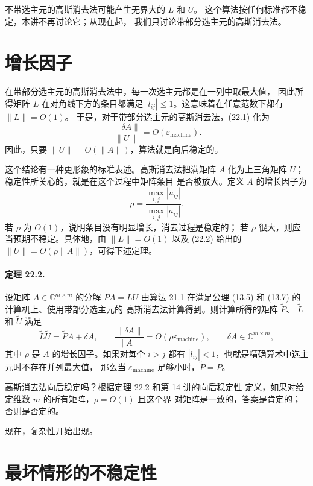\documentclass[UTF8,fontset=none,12pt]{ctexart}
\newcommand{\epsmach}{\varepsilon_{\mathrm{machine}}}
\begin{document}
不带选主元的高斯消去法可能产生无界大的 $L$ 和 $U$。
这个算法按任何标准都不稳定，本讲不再讨论它；从现在起，
我们只讨论带部分选主元的高斯消去法。

\section*{增长因子}

在带部分选主元的高斯消去法中，每一次选主元都是在一列中取最大值，
因此所得矩阵 $L$ 在对角线下方的条目都满足
$|l_{ij}|\le 1$。这意味着在任意范数下都有 $\|L\|=O(1)$。
于是，对于带部分选主元的高斯消去法，(22.1) 化为
\begin{equation*}
 \frac{\|\delta A\|}{\|U\|}=O(\epsmach).
\end{equation*}
因此，只要 $\|U\|=O(\|A\|)$，算法就是向后稳定的。

这个结论有一种更形象的标准表述。高斯消去法把满矩阵 $A$
化为上三角矩阵 $U$；稳定性所关心的，就是在这个过程中矩阵条目
是否被放大。定义 $A$ 的增长因子为
\begin{equation}
 \rho=\frac{\displaystyle\max_{i,j}|u_{ij}|}
 {\displaystyle\max_{i,j}|a_{ij}|}.
 \tag{22.2}
\end{equation}
若 $\rho$ 为 $O(1)$，说明条目没有明显增长，消去过程是稳定的；
若 $\rho$ 很大，则应当预期不稳定。具体地，由 $\|L\|=O(1)$
以及 (22.2) 给出的 $\|U\|=O(\rho\|A\|)$，可得下述定理。

\paragraph{定理 22.2.}
设矩阵 $A\in\mathbb{C}^{m\times m}$ 的分解 $PA=LU$ 由算法 21.1
在满足公理 (13.5) 和 (13.7) 的计算机上、使用带部分选主元的
高斯消去法计算得到。则计算所得的矩阵 $\widetilde P$、
$\widetilde L$ 和 $\widetilde U$ 满足
\begin{equation}
 \widetilde L\widetilde U=\widetilde P A+\delta A,\qquad
 \frac{\|\delta A\|}{\|A\|}=O(\rho\epsmach),
 \qquad \delta A\in\mathbb{C}^{m\times m},
 \tag{22.3}
\end{equation}
其中 $\rho$ 是 $A$ 的增长因子。如果对每个 $i>j$ 都有
$|l_{ij}|<1$，也就是精确算术中选主元时不存在并列最大值，
那么当 $\epsmach$ 足够小时，$\widetilde P=P$。

高斯消去法向后稳定吗？根据定理 22.2 和第 14 讲的向后稳定性
定义，如果对给定维数 $m$ 的所有矩阵，$\rho=O(1)$ 且这个界
对矩阵是一致的，答案是肯定的；否则是否定的。

现在，复杂性开始出现。

\section*{最坏情形的不稳定性}
\end{document}
